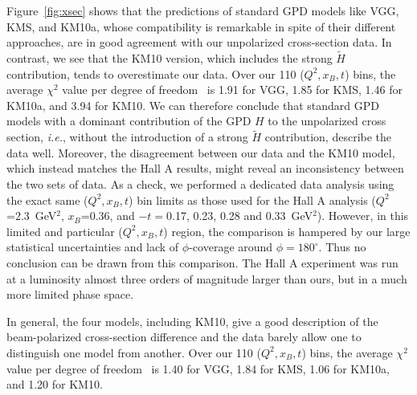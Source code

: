 \documentclass[nofootinbib,twocolumn,showpacs,prl,superscriptaddress,secnumarabic,amssymb,nobibnotes,aps,floatfix]{revtex4-1}
\begin{document}
Figure~\ref{fig:xsec} shows that the predictions of standard GPD models like VGG, KMS, and KM10a,
whose compatibility is remarkable in spite of their different approaches,
are in good agreement with our unpolarized cross-section data. In contrast, we see that the
KM10 version, which includes the strong $\tilde H$ contribution, tends to overestimate our data.
Over our 110 ($Q^2,x_B,t$) bins, the average $\chi^2$ value
per degree of freedom~\cite{chi2}
is 1.91 for VGG, 1.85 for KMS, 
1.46 for KM10a, and 3.94 for KM10.
We can therefore conclude that standard GPD models with a dominant contribution of the
GPD $H$ to the unpolarized cross section, \textit{i.e.}, without the introduction of a strong
$\tilde H$ contribution, describe the data well. Moreover, the disagreement between our data
and the KM10 model, which instead matches the Hall A results, might reveal an inconsistency
between
the two sets of data. As a check, we performed a dedicated data analysis using the exact same
($Q^2,x_B,t$) bin limits as those used for the Hall A analysis ($Q^2$=2.3~GeV$^2$, $x_B$=0.36,
and $-t=$0.17, 0.23, 0.28 and 0.33~GeV$^2$). However, in this limited and particular
($Q^2,x_B,t$) region, the comparison is hampered by our large statistical
uncertainties and lack of $\phi$-coverage around $\phi=180^\circ$.
Thus no conclusion can be drawn from this comparison.
The Hall A experiment was run at a luminosity almost
three orders of magnitude larger than ours, but in a much more limited phase space.

In general, the four models, including KM10, give a good description of the beam-polarized
cross-section difference and the data barely allow one to distinguish one model from another.
Over our 110 ($Q^2,x_B,t$) bins, the average $\chi^2$ value
per degree of freedom~\cite{chi2}
is 1.40 for VGG, 1.84 for KMS,
1.06 for KM10a, and 1.20 for KM10. 
\end{document}
